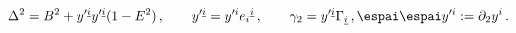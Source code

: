 \begin{equation}
\Delta^2=B^2+y'^{\underline{i}}y'^{\underline{i}}(1-E^2)\,, \qquad
y'^{\underline{i}}=y'^i e_i{}^{\underline{i}}\,,\qquad \gamma
_2=y'^{\underline{i}}\Gamma _{\underline{i}}\,, \espai\espai  y'^i
:=\partial_2y^i\,. \label{gamma2}
\end{equation}

